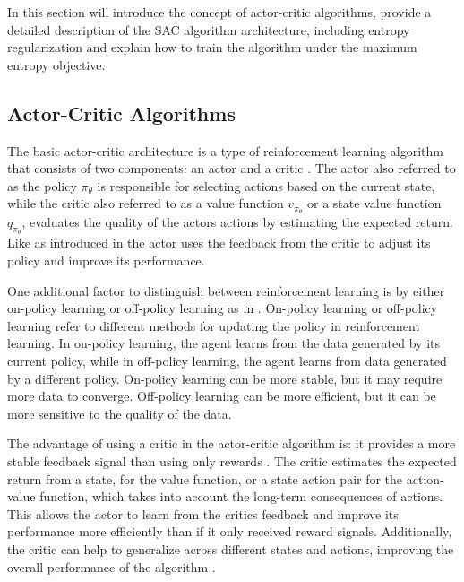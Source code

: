 In this section will introduce the concept of actor-critic algorithms, provide a detailed description of the SAC algorithm architecture, including entropy regularization and explain how to train the algorithm under the maximum entropy objective. 

\subsection{Actor-Critic Algorithms}

The basic actor-critic architecture is a type of reinforcement learning algorithm that consists of two components: an actor and a critic \cite{Actor_Critic_Algorithms}. The actor also referred to as the policy $\pi_\theta$ is responsible for selecting actions based on the current state, while the critic also referred to as a value function $v_{\pi_\theta}$ or a state value function $q_{\pi_\theta}$, evaluates the quality of the actors actions by estimating the expected return. Like as introduced in  the actor uses the feedback from the critic to adjust its policy and improve its performance.

One additional factor to distinguish between reinforcement learning is by either on-policy learning or off-policy learning as in \cite{SuttonBartoRLBook}. On-policy learning or off-policy learning refer to different methods for updating the policy in reinforcement learning. In on-policy learning, the agent learns from the data generated by its current policy, while in off-policy learning, the agent learns from data generated by a different policy. On-policy learning can be more stable, but it may require more data to converge. Off-policy learning can be more efficient, but it can be more sensitive to the quality of the data.

The advantage of using a critic in the actor-critic algorithm is: it provides a more stable feedback signal than using only rewards \cite{SpinningUp2018}. The critic estimates the expected return from a state, for the value function, or a state action pair for the action-value function, which takes into account the long-term consequences of actions. This allows the actor to learn from the critics feedback and improve its performance more efficiently than if it only received reward signals. Additionally, the critic can help to generalize across different states and actions, improving the overall performance of the algorithm \cite{SpinningUp2018}.

